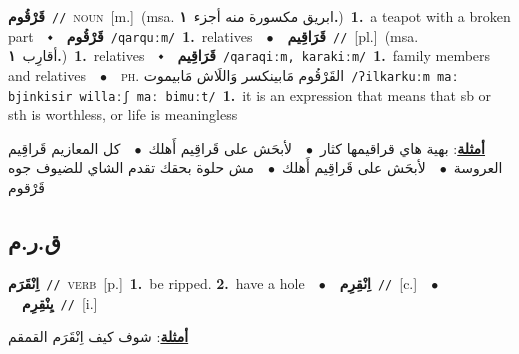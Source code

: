 \documentclass[10pt,a4paper,twoside]{article} %
\begin{document}
\begin{multicols}{2}
{\setlength\topsep{0pt}\textbf{\foreignlanguage{arabic}{قَرْقُوم}}\ {\color{gray}\texttt{//}\color{black}}\ \textsc{noun}\ [m.]\ \color{gray}(msa. \foreignlanguage{arabic}{ابريق مكسورة منه أجزء}~\foreignlanguage{arabic}{\textbf{١.}})\color{black}\ \textbf{1.}~a teapot with a broken part\ \ $\smblkdiamond$\ \ \setlength\topsep{0pt}\textbf{\foreignlanguage{arabic}{قَرْقُوم}}\ {\color{gray}\texttt{/qarquːm/}\color{black}}\ \textbf{1.}~relatives\ \ $\bullet$\ \ \setlength\topsep{0pt}\textbf{\foreignlanguage{arabic}{قَرَاقِيم}}\ {\color{gray}\texttt{//}\color{black}}\ [pl.]\ \color{gray}(msa. \foreignlanguage{arabic}{أقارِب}~\foreignlanguage{arabic}{\textbf{١.}})\color{black}\ \textbf{1.}~relatives\ \ $\smblkdiamond$\ \ \setlength\topsep{0pt}\textbf{\foreignlanguage{arabic}{قَرَاقِيم}}\ {\color{gray}\texttt{/qaraqiːm, karakiːm/}\color{black}}\ \textbf{1.}~family members and relatives\ \ $\bullet$\ \ \textsc{ph.} \color{gray} \foreignlanguage{arabic}{القَرْقُوم مَابينكسر وَاللَاش مَابيموت}\color{black}\ {\color{gray}\texttt{/{\sffamily ʔilkarkuːm maː bjinkisir willaːʃ maː bimuːt}/}\color{black}}\ \textbf{1.}~it is an expression that means that sb or sth is worthless, or life is meaningless\  \begin{flushright}\color{gray}\foreignlanguage{arabic}{\textbf{\underline{\foreignlanguage{arabic}{أمثلة}}}: بهية هاي قراقيمها كثار\ $\bullet$\ \  لأبحَش على قَراقِيم أَهلك\ $\bullet$\ \  كل المعازيم قَراقِيم العروسة\ $\bullet$\ \  لأبحَش على قَراقِيم أَهلك\ $\bullet$\ \  مش حلوة  بحقك تقدم الشاي  للضيوف جوه قَرْقوم}\end{flushright}\color{black}} \vspace{2mm}

\vspace{-3mm}
\subsection*{\color{blue}\foreignlanguage{arabic}{ق.ر.م}\color{blue}{}} 

{\setlength\topsep{0pt}\textbf{\foreignlanguage{arabic}{اِنْقَرَم}}\ {\color{gray}\texttt{//}\color{black}}\ \textsc{verb}\ [p.]\ \textbf{1.}~be ripped.  \textbf{2.}~have a hole\ \ $\bullet$\ \ \setlength\topsep{0pt}\textbf{\foreignlanguage{arabic}{اِنْقِرِم}}\ {\color{gray}\texttt{//}\color{black}}\ [c.]\ \ $\bullet$\ \ \setlength\topsep{0pt}\textbf{\foreignlanguage{arabic}{يِنْقِرِم}}\ {\color{gray}\texttt{//}\color{black}}\ [i.]\  \begin{flushright}\color{gray}\foreignlanguage{arabic}{\textbf{\underline{\foreignlanguage{arabic}{أمثلة}}}: شوف كيف اِنْقَرَم القمقم}\end{flushright}\color{black}} \vspace{2mm}


\end{multicols}
\end{document}
